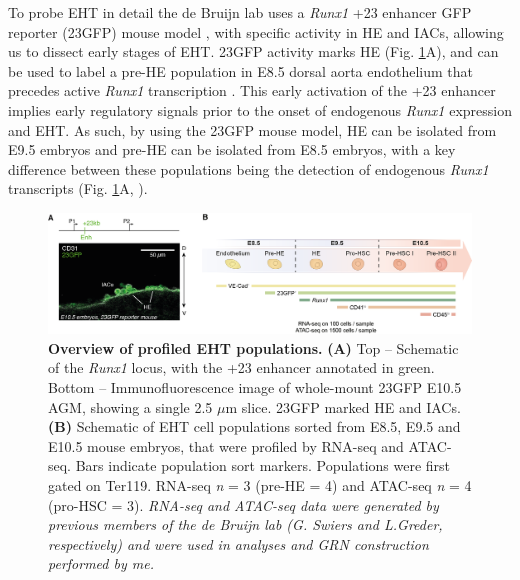 To probe EHT in detail the de Bruijn lab uses a \textit{Runx1} +23 enhancer GFP reporter (23GFP) mouse model \citep{bee_nonredundant_2010}, with specific activity in HE and IACs, allowing us to dissect early stages of EHT. 23GFP activity marks HE (Fig. \ref{fig:ch3_overview}A), and can be used to label a pre-HE population in E8.5 dorsal aorta endothelium that precedes active \textit{Runx1} transcription \citep{swiers_early_2013}. This early activation of the +23 enhancer implies early regulatory signals prior to the onset of endogenous \textit{Runx1} expression and EHT. As such, by using the 23GFP mouse model, HE can be isolated from E9.5 embryos and pre-HE can be isolated from E8.5 embryos, with a key difference between these populations being the detection of endogenous \textit{Runx1} transcripts (Fig. \ref{fig:ch3_overview}A, \cite{swiers_early_2013}).

\begin{figure}[!b]
    \centering
    \includegraphics[width=\textwidth,height=\textheight,keepaspectratio]{figures/chapter3/ch3_overview.png}
    \caption[{Overview of profiled EHT populations.}]
    {\textbf{Overview of profiled EHT populations.} 
    \textbf{(A)} Top – Schematic of the \textit{Runx1} locus, with the +23 enhancer annotated in green. Bottom –  Immunofluorescence image of whole-mount 23GFP E10.5 AGM, showing a single 2.5 $\mu$m slice. 23GFP marked HE and IACs. 
    \textbf{(B)} Schematic of EHT cell populations sorted from E8.5, E9.5 and E10.5 mouse embryos, that were profiled by RNA-seq and ATAC-seq. Bars indicate population sort markers. Populations were first gated on Ter119\uneg{}. RNA-seq \textit{n} = 3 (pre-HE = 4) and ATAC-seq \textit{n} = 4 (pro-HSC = 3). 
    \textit{RNA-seq and ATAC-seq data were generated by previous members of the de Bruijn lab (G. Swiers and L.Greder, respectively) and were used in analyses and GRN construction performed by me.}
    }
    \label{fig:ch3_overview}
\end{figure}

